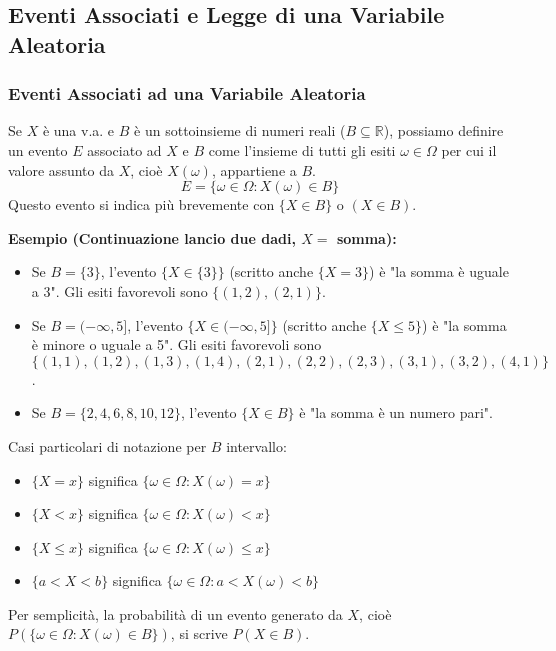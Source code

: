 \subsection{Eventi Associati e Legge di una Variabile Aleatoria}

\subsubsection{Eventi Associati ad una Variabile Aleatoria}
Se $X$ è una v.a. e $B$ è un sottoinsieme di numeri reali ($B \subseteq \mathbb{R}$), possiamo definire un evento $E$ associato ad $X$ e $B$ come l'insieme di tutti gli esiti $\omega \in \Omega$ per cui il valore assunto da $X$, cioè $X(\omega)$, appartiene a $B$.
\[ E = \{\omega \in \Omega : X(\omega) \in B\} \]
Questo evento si indica più brevemente con $\{X \in B\}$ o $(X \in B)$.

\begin{example}
\textbf{Esempio (Continuazione lancio due dadi, $X=$ somma):}
\begin{itemize}
    \item Se $B = \{3\}$, l'evento $\{X \in \{3\}\}$ (scritto anche $\{X=3\}$) è "la somma è uguale a 3".
    Gli esiti favorevoli sono $\{(1,2), (2,1)\}$.
    \item Se $B = (-\infty, 5]$, l'evento $\{X \in (-\infty, 5]\}$ (scritto anche $\{X \le 5\}$) è "la somma è minore o uguale a 5".
    Gli esiti favorevoli sono $\{(1,1), (1,2), (1,3), (1,4), (2,1), (2,2), (2,3), (3,1), (3,2), (4,1)\}$.
    \item Se $B = \{2, 4, 6, 8, 10, 12\}$, l'evento $\{X \in B\}$ è "la somma è un numero pari".
\end{itemize}
\end{example}

Casi particolari di notazione per $B$ intervallo:
\begin{itemize}
    \item $\{X = x\}$ significa $\{\omega \in \Omega : X(\omega) = x\}$
    \item $\{X < x\}$ significa $\{\omega \in \Omega : X(\omega) < x\}$
    \item $\{X \le x\}$ significa $\{\omega \in \Omega : X(\omega) \le x\}$
    \item $\{a < X < b\}$ significa $\{\omega \in \Omega : a < X(\omega) < b\}$
\end{itemize}
Per semplicità, la probabilità di un evento generato da $X$, cioè $P(\{\omega \in \Omega: X(\omega) \in B\})$, si scrive $P(X \in B)$.

